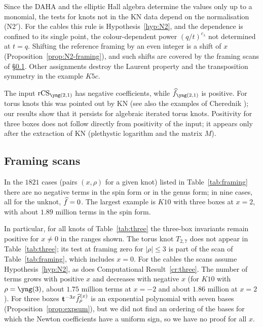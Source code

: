 Since the DAHA and the elliptic Hall algebra determine the values only up to a monomial, the tests for knots not in the KN data depend on the normalisation (N2$'$).
For the cables this rule is Hypothesis~\ref{hyp:N2}, and the dependence is confined to its single point, the colour-dependent power $(q/t)^{c_\lambda}$ not determined at $t=q$.
Shifting the reference framing by an even integer is a shift of $x$ (Proposition~\ref{prop:N2-framing}), and such shifts are covered by the framing scans of \S\ref{sec:three-x}.
Other assignments destroy the Laurent property and the transposition symmetry in the example $K5c$.

The input $\rCS_{\yng(2,1)}$ has negative coefficients, while $\hf_{\yng(2,1)}$ is positive.
For torus knots this was pointed out by KN \cite{Kameyama17} (see also the examples of Cherednik \cite{Cherednik11}); our results show that it persists for algebraic iterated torus knots.
Positivity for three boxes does not follow directly from positivity of the input; it appears only after the extraction of KN (plethystic logarithm and the matrix $M$).

\subsection{Framing scans}\label{sec:three-x}
\begin{compresult}\label{cr:framing-batch}
In the $1821$ cases (pairs $(x,\rho)$ for a given knot) listed in Table~\ref{tab:framing} there are no negative terms in the spin form or in the genus form; in nine cases, all for the unknot, $\widehat{f}=0$.
The largest example is $K10$ with three boxes at $x=2$, with about $1.89$ million terms in the spin form.
\end{compresult}
\begin{table}[h]
\centering
\caption{Framing scans. The columns $|\rho|=1,2,3$ give the range of framings $x$ examined; ``cases'' is the number of pairs $(x,\rho)$ tested (``each'' means per knot;
the case $x=0$ of $K10$ with three boxes belongs to Table~\ref{tab:three} and is not counted here); the last column is the total number of negative terms in the spin form and in the genus form.}\label{tab:framing}
\sbox\tabbox{}\resizebox{\textwidth}{!}{\usebox\tabbox}
\end{table}
In particular, for all knots of Table~\ref{tab:three} the three-box invariants remain positive for $x\neq0$ in the ranges shown.
The torus knot $T_{2,7}$ does not appear in Table~\ref{tab:three}; its test at framing zero for $|\rho|\le3$ is part of the scan of Table~\ref{tab:framing}, which includes $x=0$.
For the cables the scans assume Hypothesis~\ref{hyp:N2}, as does Computational Result~\ref{cr:three}.
The number of terms grows with positive $x$ and decreases with negative $x$ (for $K10$ with $\rho=\yng(3)$, about $1.75$ million terms at $x=-2$ and about $1.86$ million at $x=2$).
For three boxes $\mathbf{t}^{-3x}\widehat{f}^{(x)}_\rho$ is an exponential polynomial with seven bases (Proposition~\ref{prop:expsum}),
but we did not find an ordering of the bases for which the Newton coefficients have a uniform sign, so we have no proof for all $x$.

